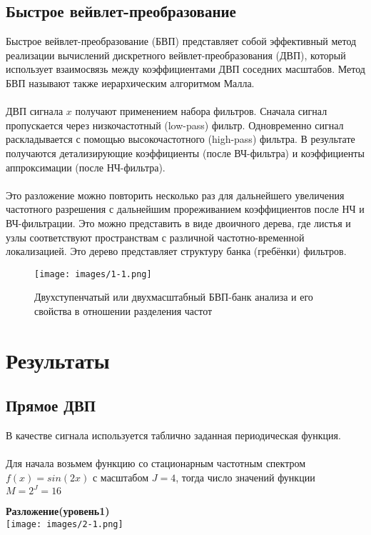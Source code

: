 \documentclass[12pt]{article}
\begin{document}
\subsection*{Быстрое вейвлет-преобразование}

Быстрое вейвлет-преобразование (БВП) представляет собой эффективный метод реализации вычислений дискретного вейвлет-преобразования (ДВП), который использует взаимосвязь между коэффициентами ДВП соседних масштабов. Метод БВП называют также иерархическим алгоритмом Малла.\\
\\
ДВП сигнала $x$ получают применением набора фильтров. Сначала сигнал пропускается через низкочастотный (low-pass) фильтр. Одновременно сигнал раскладывается с помощью высокочастотного (high-pass) фильтра. В результате получаются детализирующие коэффициенты (после ВЧ-фильтра) и коэффициенты аппроксимации (после НЧ-фильтра).\\
\\
Это разложение можно повторить несколько раз для дальнейшего увеличения частотного разрешения с дальнейшим прореживанием коэффициентов после НЧ и ВЧ-фильтрации. Это можно представить в виде двоичного дерева, где листья и узлы соответствуют пространствам с различной частотно-временной локализацией. Это дерево представляет структуру банка (гребёнки) фильтров.\\
\begin{figure}[h!]
  \caption{Двухступенчатый или двухмасштабный БВП-банк анализа и его свойства в отношении разделения частот}
  \texttt{[image: images/1-1.png]}
\end{figure}
\newpage
\section*{Результаты}

\subsection*{Прямое ДВП}
В качестве сигнала используется таблично заданная периодическая функция.\\
\\
Для начала возьмем функцию со стационарным частотным спектром $f(x) = sin(2x)$ с масштабом $J = 4$, тогда число значений функции $M = 2^J = 16$\\

\newpage

\textbf{Разложение(уровень1)}\\
\texttt{[image: images/2-1.png]}\\
\end{document}
